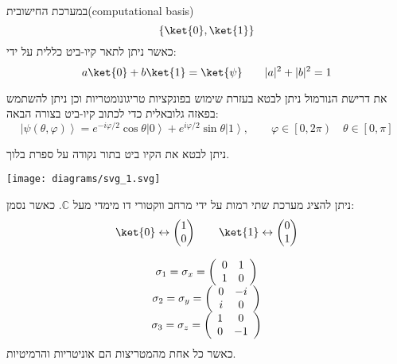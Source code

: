 \documentclass{tstextbook}
\begin{document}
\begin{definition}
במערכת החישובית(computational basis)
$$\left\{  \ket{0}   ,\ket{1} \right\}$$
כאשר ניתן לתאר קיו-ביט כללית על ידי:
$$a\ket{0} +b\ket{1} =\ket{\psi} \qquad \lvert a \rvert ^{2}+\lvert b \rvert ^{2}=1$$

\end{definition}
\begin{corollary}
את דרישת הנורמול ניתן לבטא בעזרת שימוש בפונקציות טריגונומטריות וכן ניתן להשתמש בפאזה גלובאלית כדי לכתוב קיו-ביט בצורה הבאה:
$$\left|\psi\left(\theta,\varphi\right)\right\rangle=e^{-i\varphi/2}\cos\theta\left|0\right\rangle+e^{i\varphi/2}\sin\theta\left|1\right\rangle,\qquad\varphi \in\left[ 0,2\pi \right)\quad \theta\in\left[ 0,\pi \right]$$

\end{corollary}
\begin{corollary}
ניתן לבטא את הקיו ביט בתור נקודה על ספרת בלוך.

\texttt{[image: diagrams/svg\_1.svg]}
\end{corollary}
\begin{proposition}
ניתן להציג מערכת שתי רמות על ידי מרחב ווקטורי דו מימדי מעל \(\mathbb{C}\). כאשר נסמן:
$$\ket{0} \leftrightarrow  \begin{pmatrix}1 \\ 0\end{pmatrix}\qquad \ket{1}  \leftrightarrow  \begin{pmatrix}0 \\ 1
\end{pmatrix}$$

\end{proposition}
\begin{definition}
$$\begin{array}{c}{{\sigma_{1}=\sigma_{x}=\left(\begin{array}{c c}{{0}}&{{1}}\\ {{1}}&{{0}}\end{array}\right)}}\\ {{\sigma_{2}=\sigma_{y}=\left(\begin{array}{c c}{{0}}&{{-i}}\\ {{i}}&{{0}}\end{array}\right)}}\\ {{\sigma_{3}=\sigma_{z}=\left(\begin{array}{c c}{{1}}&{{0}}\\ {{0}}&{{-1}}\end{array}\right)}}\end{array}$$
כאשר כל אחת מהמטריצות הם אוניטריות והרמיטיות.

\end{definition}
\end{document}

